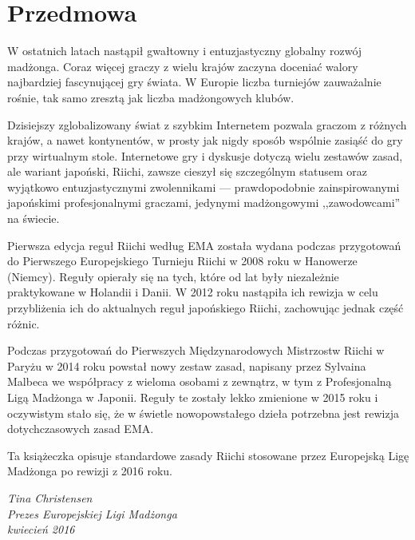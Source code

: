 \section*{Przedmowa}

W ostatnich latach nastąpił gwałtowny i entuzjastyczny globalny rozwój madżonga.
Coraz więcej graczy z wielu krajów zaczyna doceniać walory najbardziej fascynującej gry świata.
W Europie liczba turniejów zauważalnie rośnie, tak samo zresztą jak liczba madżongowych klubów.

Dzisiejszy zglobalizowany świat z szybkim Internetem pozwala graczom z różnych krajów, a nawet kontynentów, w prosty jak nigdy sposób wspólnie zasiąść do gry przy wirtualnym stole.
Internetowe gry i dyskusje dotyczą wielu zestawów zasad, ale wariant japoński, Riichi, zawsze cieszył się szczególnym statusem oraz wyjątkowo entuzjastycznymi zwolennikami --- prawdopodobnie zainspirowanymi japońskimi profesjonalnymi graczami, jedynymi madżongowymi ,,zawodowcami'' na świecie.

Pierwsza edycja reguł Riichi według EMA została wydana podczas przygotowań do Pierwszego Europejskiego Turnieju Riichi w 2008 roku w Hanowerze (Niemcy).
Reguły opierały się na tych, które od lat były niezależnie praktykowane w Holandii i Danii.
W 2012 roku nastąpiła ich rewizja w celu przybliżenia ich do aktualnych reguł japońskiego Riichi, zachowując jednak część różnic.

Podczas przygotowań do Pierwszych Międzynarodowych Mistrzostw Riichi w Paryżu w 2014 roku powstał nowy zestaw zasad, napisany przez Sylvaina Malbeca we współpracy z wieloma osobami z zewnątrz, w tym z Profesjonalną Ligą Madżonga w Japonii.
Reguły te zostały lekko zmienione w 2015 roku i oczywistym stało się, że w świetle nowopowstałego dzieła potrzebna jest rewizja dotychczasowych zasad EMA.

Ta książeczka opisuje standardowe zasady Riichi stosowane przez Europejską Ligę Madżonga po rewizji z 2016 roku.

\begin{flushright}
    \emph{
        Tina Christensen\\
        Prezes Europejskiej Ligi Madżonga\\
        kwiecień 2016
    }
\end{flushright}
